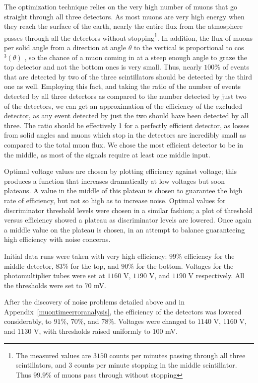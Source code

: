 The optimization technique relies on the very high number of muons that go straight through all three detectors. As most muons are very high energy when they reach the surface of the earth, nearly the entire flux from the atmosphere passes through all the detectors without stopping\footnote{The measured values are $3150$ counts per minutes passing through all three scintillators, and $3$ counts per minute stopping in the middle scintillator. Thus $99.9\%$ of muons pass through without stopping}. In addition, the flux of muons per solid angle from a direction at angle $\theta$ to the vertical is proportional to cos$^3(\theta)$ \cite{frisch}, so the chance of a muon coming in at a steep enough angle to graze the top detector and not the bottom ones is very small. Thus, nearly $100\%$ of events that are detected by two of the three scintillators should be detected by the third one as well. Employing this fact, and taking the ratio of the number of events detected by all three detectors as compared to the number detected by just two of the detectors, we can get an approximation of the efficiency of the excluded detector, as any event detected by just the two should have been detected by all three. The ratio should be effectively 1 for a perfectly efficient detector, as losses from solid angles and muons which stop in the detectors are incredibly small as compared to the total muon flux. We chose the most efficient detector to be in the middle, as most of the signals require at least one middle input.

Optimal voltage values are chosen by plotting efficiency against voltage; this produces a function that increases dramatically at low voltages but soon plateaus. A value in the middle of this plateau is chosen to guarantee the high rate of efficiency, but not so high as to increase noise. Optimal values for discriminator threshold levels were chosen in a similar fashion; a plot of threshold versus efficiency showed a plateau as discriminator levels are lowered. Once again a middle value on the plateau is chosen, in an attempt to balance guaranteeing high efficiency with noise concerns.

Initial data runs were taken with very high efficiency: $99\%$ efficiency for the middle detector, $83\%$ for the top, and $90\%$ for the bottom. Voltages for the photomultiplier tubes were set at $1160$ V, $1190$ V, and $1190$ V respectively. All the thresholds were set to $70$ mV. 

After the discovery of noise problems detailed above and in Appendix~\ref{muontimeerroranalysis}, the efficiency of the detectors was lowered considerably, to $91\%$, $70\%$, and $78\%$. Voltages were changed to $1140$ V, $1160$ V, and $1130$ V, with thresholds raised uniformly to $100$ mV.

